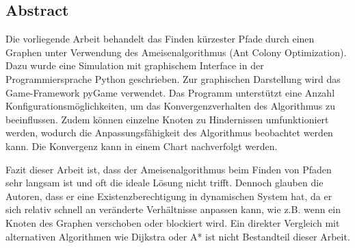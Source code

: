
\subsection*{Abstract}

Die vorliegende Arbeit behandelt das Finden kürzester Pfade durch einen Graphen unter Verwendung des Ameisenalgorithmus (Ant Colony Optimization). Dazu wurde eine Simulation mit graphischem Interface in der Programmiersprache Python geschrieben. Zur graphischen Darstellung wird das Game-Framework pyGame verwendet. Das Programm unterstützt eine Anzahl Konfigurationsmöglichkeiten, um das Konvergenzverhalten des Algorithmus zu beeinflussen. Zudem können einzelne Knoten zu Hindernissen umfunktioniert werden, wodurch die Anpassungsfähigkeit des Algorithmus beobachtet werden kann. Die Konvergenz kann in einem Chart nachverfolgt werden. 

Fazit dieser Arbeit ist, dass der Ameisenalgorithmus beim Finden von Pfaden sehr langsam ist und oft die ideale Lösung nicht trifft. Dennoch glauben die Autoren, dass er eine Existenzberechtigung in dynamischen System hat, da er sich relativ schnell an veränderte Verhältnisse anpassen kann, wie z.B. wenn ein Knoten des Graphen verschoben oder blockiert wird. Ein direkter Vergleich mit alternativen Algorithmen wie Dijkstra oder A* ist nicht Bestandteil dieser Arbeit.